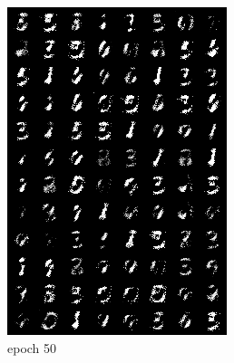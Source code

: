 \documentclass[a4paper]{article}
\theoremstyle{definition}
\newenvironment{soln}{
	\leavevmode\color{blue}\ignorespaces
}{}
\begin{document}
\begin{enumerate} [label=(\alph*)]
\begin{soln}
\begin{figure}[H]
\begin{subfigure}[b]{0.3\textwidth}
					\includegraphics[width=\textwidth]{outputs/gen_img50.png}
					\caption{epoch 50}
				\end{subfigure}
				\hfill
				\begin{subfigure}[b]{0.3\textwidth}
					\centering

\end{subfigure}
\end{figure}
\end{soln}
\end{enumerate}
\end{document}
